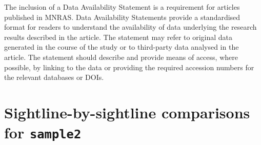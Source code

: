 \documentclass[fleqn,usenatbib]{mnras}
\begin{document}
The inclusion of a Data Availability Statement is a requirement for articles published in MNRAS. Data Availability Statements provide a standardised format for readers to understand the availability of data underlying the research results described in the article. The statement may refer to original data generated in the course of the study or to third-party data analysed in the article. The statement should describe and provide means of access, where possible, by linking to the data or providing the required accession numbers for the relevant databases or DOIs.







\appendix

\section{Sightline-by-sightline comparisons for \texttt{sample2}}
\end{document}
